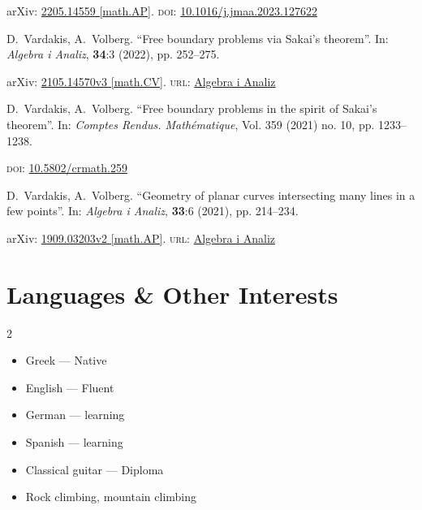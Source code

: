 \documentclass[12pt]{article}
\begin{document}
	arXiv: \href{https://arxiv.org/abs/2205.14559}{2205.14559 [math.AP]}.
	\textsc{doi}: \href{https://doi.org/10.1016/j.jmaa.2023.127622}{10.1016/j.jmaa.2023.127622}
\medskip


D.~Vardakis, A.~Volberg.
	\enquote{Free boundary problems via Sakai's theorem}.
	In: \emph{Algebra i Analiz}, \textbf{34}:3 (2022), pp. 252--275.
	
	arXiv: \href{https://arxiv.org/abs/2105.14570v3}{2105.14570v3 [math.CV]}.
	\textsc{url}: \href{http://www.mathnet.ru/php/archive.phtml?wshow=paper&jrnid=aa&paperid=1818&option_lang=eng}{Algebra i Analiz}
\medskip


D.~Vardakis, A.~Volberg.
	\enquote{Free boundary problems in the spirit of Sakai’s theorem}.
	In: \emph{Comptes Rendus. Math{\'e}matique}, Vol. 359 (2021) no. 10, pp. 1233--1238.
	
	\textsc{doi}: \href{https://doi.org/10.5802/crmath.259}{10.5802/crmath.259} %
\medskip


D.~Vardakis, A.~Volberg.
	\enquote{Geometry of planar curves intersecting many lines in a few points}.
	In: \emph{Algebra i Analiz}, \textbf{33}:6 (2021), pp. 214--234.
	
	arXiv: \href{https://arxiv.org/abs/1909.03203v2}{1909.03203v2 [math.AP]}.
	\textsc{url}: \href{http://mi.mathnet.ru/eng/aa/v33/i6/p214}{Algebra i Analiz}


\section*{Languages \& Other Interests}

\begin{multicols}{2}
	\begin{itemize}
		\item Greek --- Native
		\item English --- Fluent
		\item German --- learning
		\item Spanish --- learning
		\item Classical guitar --- Diploma
		\item Rock climbing, mountain climbing
	\end{itemize}
\end{multicols}
\end{document}
